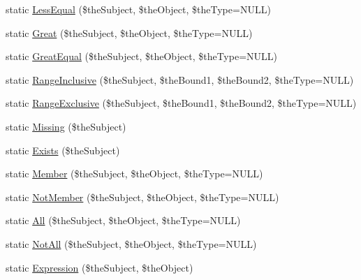 \begin{DoxyCompactItemize}
static \hyperlink{class_c_query_statement_a292880d593cc8b46dba77d13004aaa28}{Less\-Equal} (\$the\-Subject, \$the\-Object, \$the\-Type=N\-U\-L\-L)
\item 
static \hyperlink{class_c_query_statement_abe09c835887534aeecbeffad2045c917}{Great} (\$the\-Subject, \$the\-Object, \$the\-Type=N\-U\-L\-L)
\item 
static \hyperlink{class_c_query_statement_a540d93d646384d5a145d3944d72246e3}{Great\-Equal} (\$the\-Subject, \$the\-Object, \$the\-Type=N\-U\-L\-L)
\item 
static \hyperlink{class_c_query_statement_ae18f91d3c6c1ad07bb380d959ce01c1b}{Range\-Inclusive} (\$the\-Subject, \$the\-Bound1, \$the\-Bound2, \$the\-Type=N\-U\-L\-L)
\item 
static \hyperlink{class_c_query_statement_a182c44c738d574e6d331d5bd894ce8e7}{Range\-Exclusive} (\$the\-Subject, \$the\-Bound1, \$the\-Bound2, \$the\-Type=N\-U\-L\-L)
\item 
static \hyperlink{class_c_query_statement_a45c462050093bf18a5065cb018c91a34}{Missing} (\$the\-Subject)
\item 
static \hyperlink{class_c_query_statement_aba90304323e0de3966810bf1bed26ef4}{Exists} (\$the\-Subject)
\item 
static \hyperlink{class_c_query_statement_a5e1a291d73a20b4f88c019d1863a4c81}{Member} (\$the\-Subject, \$the\-Object, \$the\-Type=N\-U\-L\-L)
\item 
static \hyperlink{class_c_query_statement_aeb90f2ea2237ddc0ab01d9965538abf4}{Not\-Member} (\$the\-Subject, \$the\-Object, \$the\-Type=N\-U\-L\-L)
\item 
static \hyperlink{class_c_query_statement_a7cb662f303eb30652460fd4903053ca8}{All} (\$the\-Subject, \$the\-Object, \$the\-Type=N\-U\-L\-L)
\item 
static \hyperlink{class_c_query_statement_ac3c86273637210e1d117cae10ff9bfe9}{Not\-All} (\$the\-Subject, \$the\-Object, \$the\-Type=N\-U\-L\-L)
\item 
static \hyperlink{class_c_query_statement_ae668b0a35863ac739a188cecd84027a5}{Expression} (\$the\-Subject, \$the\-Object)
\end{DoxyCompactItemize}


